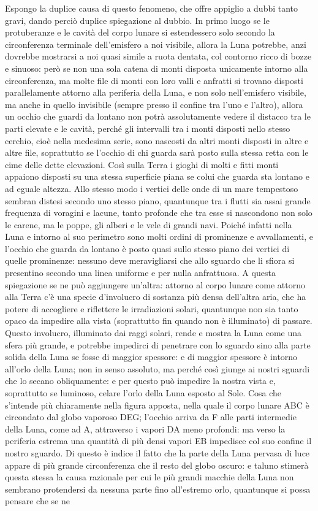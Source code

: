 \documentclass[11pt,twoside,openany]{book}
\begin{document}
Espongo la duplice causa di questo fenomeno, che offre appiglio a dubbi tanto gravi, dando perciò duplice spiegazione al dubbio. In primo luogo se le protuberanze e le cavità del corpo lunare si estendessero solo secondo la circonferenza terminale dell'emisfero a noi visibile, allora la Luna potrebbe, anzi dovrebbe mostrarsi a noi quasi simile a ruota dentata, col contorno ricco di bozze e sinuoso: però se non una sola catena di monti disposta unicamente intorno alla circonferenza, ma molte file di monti con loro valli e anfratti si trovano disposti parallelamente attorno alla periferia della Luna, e non solo nell'emisfero visibile, ma anche in quello invisibile (sempre presso il confine tra l'uno e l'altro), allora un occhio che guardi da lontano non potrà assolutamente vedere il distacco tra le parti elevate e le cavità, perché gli intervalli tra i monti disposti nello stesso cerchio, cioè nella medesima serie, sono nascosti da altri monti disposti in altre e altre file, soprattutto se l'occhio di chi guarda sarà posto sulla stessa retta con le cime delle dette elevazioni. Così sulla Terra i gioghi di molti e fitti monti appaiono disposti su una stessa superficie piana se colui che guarda sta lontano e ad eguale altezza. Allo stesso modo i vertici delle onde di un mare tempestoso sembran distesi secondo uno stesso piano, quantunque tra i flutti sia assai grande frequenza di voragini e lacune, tanto profonde che tra esse si nascondono non solo le carene, ma le poppe, gli alberi e le vele di grandi navi. Poiché infatti nella Luna e intorno al suo perimetro sono molti ordini di prominenze e avvallamenti, e l'occhio che guarda da lontano è posto quasi sullo stesso piano dei vertici di quelle prominenze: nessuno deve meravigliarsi che allo sguardo che li sfiora si presentino secondo una linea uniforme e per nulla anfrattuosa. A questa spiegazione se ne può aggiungere un'altra: attorno al corpo lunare come attorno alla Terra c'è una specie d'involucro di sostanza più densa dell'altra aria, che ha potere di accogliere e riflettere le irradiazioni solari, quantunque non sia tanto opaco da impedire alla vista (soprattutto fin quando non è illuminato) di passare. Questo involucro, illuminato dai raggi solari, rende e mostra la Luna come una sfera più grande, e potrebbe impedirci di penetrare con lo sguardo sino alla parte solida della Luna se fosse di maggior spessore: e di maggior spessore è intorno all'orlo della Luna; non in senso assoluto, ma perché così giunge ai nostri sguardi che lo secano obliquamente: e per questo può impedire la nostra vista e, soprattutto se luminoso, celare l'orlo della Luna esposto al Sole. Cosa che s'intende più chiaramente nella figura apposta, nella quale il corpo lunare ABC è circondato dal globo vaporoso DEG; l'occhio arriva da F alle parti intermedie della Luna, come ad A, attraverso i vapori DA meno profondi: ma verso la periferia estrema una quantità di più densi vapori EB impedisce col suo confine il nostro sguardo. Di questo è indice il fatto che la parte della Luna pervasa di luce appare di più grande circonferenza che il resto del globo oscuro: e taluno stimerà questa stessa la causa razionale per cui le più grandi macchie della Luna non sembrano protendersi da nessuna parte fino all'estremo orlo, quantunque si possa pensare che se ne 
\end{document}
